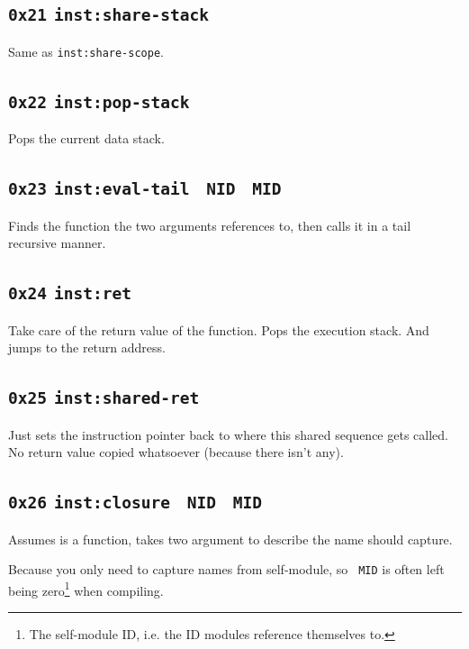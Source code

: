 \documentclass{report}
\newcommand{\mtilde}[1]{\textasciitilde}
\newcommand{\marg}[1]{\texttt{\mtilde ~#1}}
\newcommand{\inst}[1] {\texttt{inst:#1}}
\begin{document}
\subsection{\texttt{0x21} \inst{share-stack}}

Same as \inst{share-scope}.

\subsection{\texttt{0x22} \inst{pop-stack}}

Pops the current data stack.

\subsection{\texttt{0x23} \inst{eval-tail} \marg{NID} \marg{MID}}

Finds the function the two arguments references to, then calls it in a tail recursive manner.

\subsection{\texttt{0x24} \inst{ret} }

Take care of the return value of the function. Pops the execution stack. And jumps to the return address.

\subsection{\texttt{0x25} \inst{shared-ret}}

Just sets the instruction pointer back to where this shared sequence gets called. No return value copied whatsoever (because there isn't any).

\subsection{\texttt{0x26} \inst{closure} \marg{NID} \marg{MID} }

Assumes  is a function, takes two argument to describe the name  should capture.

\begin{mdframed}[style=detail]
  Because you only need to capture names from self-module, so \marg{MID} is often left being zero\footnote{The self-module ID, i.e. the ID modules reference themselves to.} when compiling.
\end{mdframed}
\end{document}
